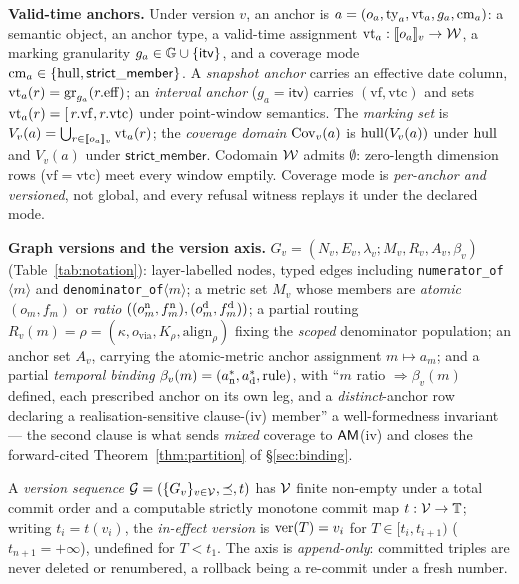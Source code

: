 \noindent{}\textbf{Valid-time anchors.} Under version $v$, an anchor is
$a=(o_a,\mathrm{ty}_a,\allowbreak\mathrm{vt}_a,g_a,\mathrm{cm}_a)$: a semantic object, an
anchor type,
a valid-time assignment $\mathrm{vt}_a:[\![o_a]\!]_v\to\mathcal{W}$, a marking granularity
$g_a\in\mathbb{G}\cup\{\mathsf{itv}\}$, and a coverage mode
$\mathrm{cm}_a\in\{\mathrm{hull},\mathsf{strict\_member}\}$. A \emph{snapshot anchor}
carries an effective date column, $\mathrm{vt}_a(r)=\mathrm{gr}_{g_a}(r.\mathrm{eff})$;
an \emph{interval anchor} ($g_a=\mathsf{itv}$) carries
$(\mathrm{vf},\mathrm{vtc})$ and sets
$\mathrm{vt}_a(r)=[\,r.\mathrm{vf},r.\mathrm{vtc})$ under point-window semantics. The
\emph{marking set} is $V_v(a)=\bigcup_{r\in[\![o_a]\!]_v}\mathrm{vt}_a(r)$; the
\emph{coverage domain} $\mathrm{Cov}_v(a)$ is $\mathrm{hull}(V_v(a))$ under $\mathrm{hull}$ and
$V_v(a)$ under $\mathsf{strict\_member}$.
Codomain $\mathcal{W}$ admits $\emptyset$: zero-length dimension rows
($\mathrm{vf}=\mathrm{vtc}$) meet every window emptily. Coverage mode is
\emph{per-anchor and versioned}, not global, and every refusal witness
replays it under the declared mode.

\smallskip\noindent{}\textbf{Graph versions and the version axis.}
$G_v=(N_v,E_v,\lambda_v;\allowbreak M_v,R_v,A_v,\beta_v)$
(Table~\ref{tab:notation}): layer-labelled nodes, typed edges including
\texttt{numerator\_\allowbreak of}$\langle m\rangle$ and
\texttt{denominator\_\allowbreak of}$\langle m\rangle$; a metric set $M_v$ whose
members are \emph{atomic} $(o_m,f_m)$ or \emph{ratio}
$((o^{\mathrm{n}}_m,f^{\mathrm{n}}_m),\allowbreak(o^{\mathrm{d}}_m,f^{\mathrm{d}}_m))$; a partial
routing
$R_v(m)=\rho=(\kappa,o_{\mathrm{via}},\allowbreak K_\rho,\mathrm{align}_\rho)$
fixing the \emph{scoped} denominator population; an anchor set
$A_v$, carrying the atomic-metric anchor assignment $m\mapsto a_m$; and a
partial \emph{temporal binding}
$\beta_v(m)=(a^*_{\mathrm{n}},a^*_{\mathrm{d}},\mathrm{rule})$, with ``$m$ ratio
$\Rightarrow\beta_v(m)$ defined, each prescribed anchor on its own leg, and a
\emph{distinct}-anchor row declaring a realisation-sensitive clause-(iv)
member'' a well-formedness invariant --- the second clause is what sends
\emph{mixed} coverage to $\mathsf{AM}$(iv) and closes the forward-cited
Theorem~\ref{thm:partition} of \S\ref{sec:binding}.

\noindent{} A \emph{version sequence}
$\mathcal{G}=(\{G_v\}_{v\in\mathcal{V}},\preceq,t)$ has $\mathcal{V}$ finite non-empty under a
total commit order and a computable strictly monotone commit map
$t:\mathcal{V}\to\mathbb{T}$; writing $t_i=t(v_i)$, the \emph{in-effect version} is
$\mathrm{ver}(T)=v_i$ for $T\in[t_i,t_{i+1})$ ($t_{n+1}{=}{+}\infty$), undefined for
$T<t_1$. The axis is \emph{append-only}: committed triples are never
deleted or renumbered, a rollback being a re-commit under a fresh number.

